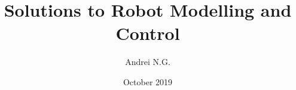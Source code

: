\documentclass[a4paper,12pt]{book}
\begin{document}
\author{Andrei N.G.}
\title{Solutions to Robot Modelling and Control}
\date{October 2019}

\frontmatter
\maketitle
\tableofcontents

\mainmatter




\end{document}

